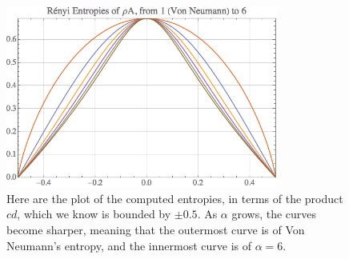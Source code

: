 \documentclass{_mypackages/monograph}
\begin{document}
\begin{figure}[H]
    \centering
    \includegraphics[width=0.8\textwidth]{Landi5_plot.png}
    \caption{Here are the plot of the computed entropies, in terms of the product \(cd\), which we know is bounded by \(\pm0.5\). As \(\alpha\) grows, the curves become sharper, meaning that the outermost curve is of Von Neumann's entropy, and the innermost curve is of \(\alpha=6\).}
    \label{fig:entropiesplot}
\end{figure}
\end{document}
